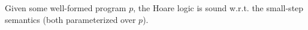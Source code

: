\begin{lemma}
    Given some well-formed program $p$, the Hoare logic is sound w.r.t. the small-step semantics (both parameterized over $p$).
\end{lemma}